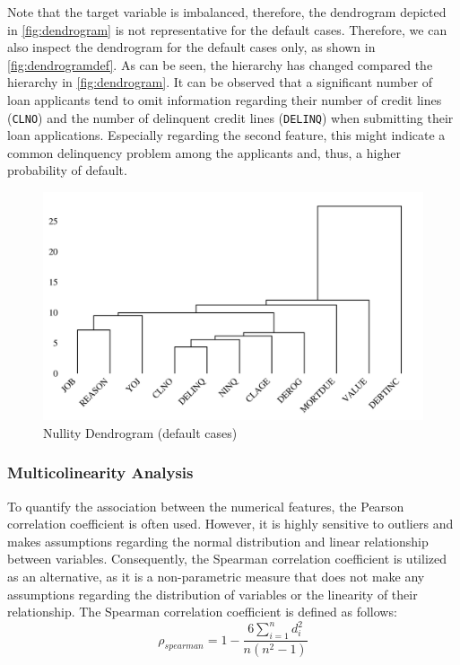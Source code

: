 Note that the target variable is imbalanced, therefore, the dendrogram depicted in \autoref{fig:dendrogram} is not representative for the default cases. Therefore, we can also inspect the dendrogram for the default cases only, as shown in \autoref{fig:dendrogramdef}.
As can be seen, the hierarchy has changed compared the hierarchy in \autoref{fig:dendrogram}. It can be observed that a significant number of loan applicants tend to omit information regarding their number of credit lines (\texttt{CLNO}) and the number of delinquent credit lines (\texttt{DELINQ}) when submitting their loan applications. Especially regarding the second feature, this might indicate a common delinquency problem among the applicants and, thus, a higher probability of default.
\begin{figure}[H]
    \centering
    \caption{Nullity Dendrogram (default cases)}\vspace{0.5em}
    \label{fig:dendrogramdef}
    \includegraphics[width=140mm]{Figures/NA_Dendrogram_defaults.jpg}

    \vspace{-1em}
\end{figure}

\subsubsection{Multicolinearity Analysis}
\label{subsubsec:multicolinearity}
To quantify the association between the numerical features, the Pearson correlation coefficient is often used.
However, it is highly sensitive to outliers and makes assumptions regarding the normal distribution and linear relationship between variables.
Consequently, the Spearman correlation coefficient is utilized as an alternative, as it is a non-parametric measure that does not make any assumptions regarding the distribution of variables or the linearity of their relationship.
The Spearman correlation coefficient is defined as follows:
\begin{equation}\label{eq}
\rho_{spearman} = 1 - \frac{6 \sum_{i=1}^{n} d_{i}^{2}}{n \left(n^{2}-1\right)}
\end{equation}


